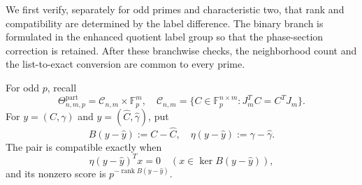 \documentclass[11pt]{article}
\newcommand{\F}{\mathbb F}
\newcommand{\rank}{\operatorname{rank}}
\newcommand{\1}{\mathbf 1}
\theoremstyle{plain}
\theoremstyle{definition}
\theoremstyle{remark}
\begin{document}
We first verify, separately for odd primes and characteristic two, that rank  
and compatibility are determined by the label difference.  The binary branch  
is formulated in the enhanced quotient label group so that the phase-section  
correction is retained.  After these branchwise checks, the neighborhood count  
and the list-to-exact conversion are common to every prime.  

For odd $p$, recall
\begin{equation}
 \Theta_{n,m,p}^{\mathrm{part}}
 =\mathcal C_{n,m}\times\F_p^m,
 \quad
 \mathcal C_{n,m}
 =\{C\in\F_p^{n\times m}:J_m^TC=C^TJ_m\}.
 \label{eq:rank-truncated-label-space}
\end{equation}
For $y=(C,\gamma)$ and
$\widehat y=(\widehat C,\widehat\gamma)$, put
\begin{equation}
 B(y-\widehat y):=C-\widehat C,
 \quad
 \eta(y-\widehat y):=\gamma-\widehat\gamma.
 \label{eq:odd-rank-truncated-differences}
\end{equation}
The pair is compatible exactly when
\begin{equation}
 \eta(y-\widehat y)^Tx=0
 \quad(x\in\ker B(y-\widehat y)),
 \label{eq:odd-rank-truncated-compatibility}
\end{equation}
and its nonzero score is
$p^{-\rank B(y-\widehat y)}$.
\end{document}
